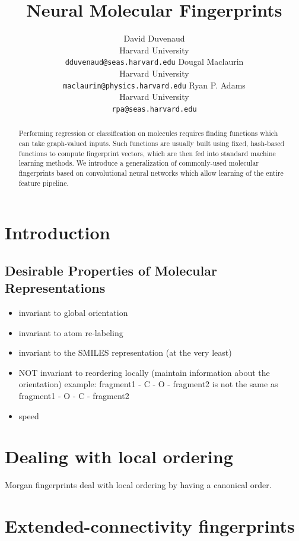 \documentclass{article} %
\title{Neural Molecular Fingerprints}
\author{
David Duvenaud\\
Harvard University\\
\texttt{dduvenaud@seas.harvard.edu}
\And
Dougal Maclaurin\\
Harvard University\\
\texttt{maclaurin@physics.harvard.edu}
\And
Ryan P. Adams\\
Harvard University\\
\texttt{rpa@seas.harvard.edu}
}
\begin{document}
\maketitle


\begin{abstract}
Performing regression or classification on molecules requires finding functions which can take graph-valued inputs.
Such functions are usually built using fixed, hash-based functions to compute fingerprint vectors, which are then fed into standard machine learning methods.
We introduce a generalization of commonly-used molecular fingerprints based on convolutional neural networks which allow learning of the entire feature pipeline.
\end{abstract}

\section{Introduction}

\subsection{Desirable Properties of Molecular Representations}

\begin{itemize}
\item invariant to global orientation
\item invariant to atom re-labeling
\item invariant to the SMILES representation (at the very least)
\item NOT invariant to reordering locally (maintain information about the orientation)
    example:  fragment1 - C - O - fragment2 is not the same as fragment1 - O - C - fragment2 
   \item speed
\end{itemize}

\section{Dealing with local ordering}

Morgan fingerprints deal with local ordering by having a canonical order.



\section{Extended-connectivity fingerprints}
\end{document}
